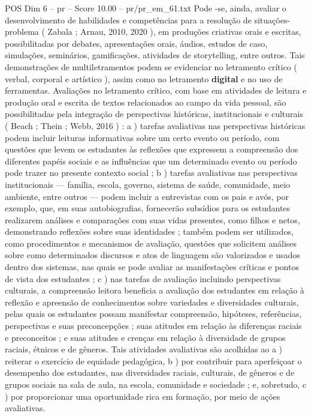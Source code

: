 \begin{textsample}{POS Dim 6 – pr – Score 10.00 – pr/pr\_em\_61.txt}
Pode -se, ainda, avaliar o desenvolvimento de habilidades e competências para a resolução de situações-problema ( Zabala ; Arnau, 2010, 2020 ), em produções criativas orais e escritas, possibilitadas por debates, apresentações orais, áudios, estudos de caso, simulações, seminários, gamificações, atividades de storytelling, entre outros.
Tais demonstrações de multiletramentos podem se evidenciar no letramento crítico ( verbal, corporal e artístico ), assim como no letramento \textbf{digital} e no uso de ferramentas.
Avaliações no letramento crítico, com base em atividades de leitura e produção oral e escrita de textos relacionados ao campo da vida pessoal, são possibilitadas pela integração de perspectivas históricas, institucionais e culturais ( Beach ; Thein ; Webb, 2016 ) : a ) tarefas avaliativas nas perspectivas históricas podem incluir leituras informativas sobre um certo evento ou período, com questões que levem os estudantes às reflexões que expressem a compreensão dos diferentes papéis sociais e as influências que um determinado evento ou período pode trazer no presente contexto social ; b ) tarefas avaliativas nas perspectivas institucionais — família, escola, governo, sistema de saúde, comunidade, meio ambiente, entre outros — podem incluir a entrevistas com os pais e avós, por exemplo, que, em suas autobiografias, fornecerão subsídios para os estudantes realizarem análises e comparações com suas vidas presentes, como filhos e netos, demonstrando reflexões sobre suas identidades ; também podem ser utilizados, como procedimentos e mecanismos de avaliação, questões que solicitem análises sobre como determinados discursos e atos de linguagem são valorizados e usados dentro dos sistemas, nas quais se pode avaliar as manifestações críticas e pontos de vista dos estudantes ; c ) nas tarefas de avaliação incluindo perspectivas culturais, a compreensão leitora beneficia a avaliação dos estudantes em relação à reflexão e apreensão de conhecimentos sobre variedades e diversidades culturais, pelas quais os estudantes possam manifestar compreensão, hipóteses, referências, perspectivas e suas preconcepções ; suas atitudes em relação às diferenças raciais e preconceitos ; e suas atitudes e crenças em relação à diversidade de grupos raciais, étnicos e de gêneros.
Tais atividades avaliativas são acolhidas ao a ) reiterar o exercício de equidade pedagógica, b ) por contribuir para aperfeiçoar o desempenho dos estudantes, nas diversidades raciais, culturais, de gêneros e de grupos sociais na sala de aula, na escola, comunidade e sociedade ; e, sobretudo, c ) por proporcionar uma oportunidade rica em formação, por meio de ações avaliativas.

\end{textsample}
